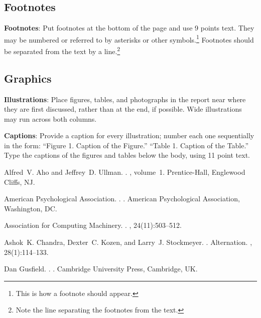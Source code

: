 \documentclass[11pt]{article}
\begin{document}
\subsection{Footnotes}

{\bf Footnotes}: Put footnotes at the bottom of the page and use 9
points text. They may be numbered or referred to by asterisks or other
symbols.\footnote{This is how a footnote should appear.} Footnotes
should be separated from the text by a line.\footnote{Note the line
separating the footnotes from the text.}

\subsection{Graphics}

{\bf Illustrations}: Place figures, tables, and photographs in the
report near where they are first discussed, rather than at the end, if
possible.  Wide illustrations may run across both columns.

{\bf Captions}: Provide a caption for every illustration; number each one
sequentially in the form:  ``Figure 1. Caption of the Figure.'' ``Table 1.
Caption of the Table.''  Type the captions of the figures and 
tables below the body, using 11 point text.

\begin{thebibliography}{}

Alfred~V. Aho and Jeffrey~D. Ullman.
.
, volume~1.
\newblock Prentice-{Hall}, Englewood Cliffs, NJ.

{American Psychological Association}.
.
.
\newblock American Psychological Association, Washington, DC.

{Association for Computing Machinery}.
.
, 24(11):503--512.

Ashok~K. Chandra, Dexter~C. Kozen, and Larry~J. Stockmeyer.
.
\newblock Alternation.
,
  28(1):114--133.

Dan Gusfield.
.
.
\newblock Cambridge University Press, Cambridge, UK.

\end{thebibliography}
\end{document}
